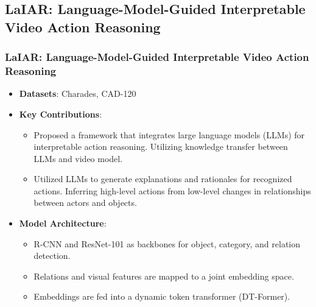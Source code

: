 \documentclass{beamer}
\begin{document}
\subsection{LaIAR: Language-Model-Guided Interpretable Video Action Reasoning}
\begin{frame}
    \frametitle{LaIAR: Language-Model-Guided Interpretable Video Action Reasoning}
    \begin{itemize}
        \item \textbf{Datasets}: Charades, CAD-120
        \item \textbf{Key Contributions}:
              \begin{itemize}
                  \item Proposed a framework that integrates large language models (LLMs) for interpretable action reasoning. Utilizing knowledge transfer between LLMs and video model.
                  \item Utilized LLMs to generate explanations and rationales for recognized actions. Inferring high-level actions from low-level changes in relationships between actors and objects.
              \end{itemize}
        \item \textbf{Model Architecture}:
              \begin{itemize}
                  \item R-CNN and ResNet-101 as backbones for object, category, and relation detection.
                  \item Relations and visual features are mapped to a joint embedding space.
                  \item Embeddings are fed into a dynamic token transformer (DT-Former).
              \end{itemize}
    \end{itemize}
\end{frame}
\end{document}
